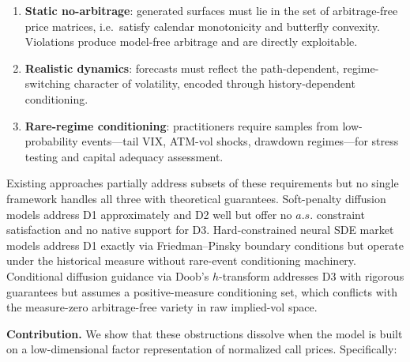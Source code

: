 \documentclass{article}
\newcommand{\1}{\mathbf{1}}
\begin{document}
\begin{enumerate}
\item[(D1)] \textbf{Static no-arbitrage}: generated surfaces must lie in the set of arbitrage-free price matrices, i.e.\ satisfy calendar monotonicity and butterfly convexity. Violations produce model-free arbitrage and are directly exploitable.
\item[(D2)] \textbf{Realistic dynamics}: forecasts must reflect the path-dependent, regime-switching character of volatility, encoded through history-dependent conditioning.
\item[(D3)] \textbf{Rare-regime conditioning}: practitioners require samples from low-probability events---tail VIX, ATM-vol shocks, drawdown regimes---for stress testing and capital adequacy assessment.
\end{enumerate}

Existing approaches partially address subsets of these requirements but no single framework handles all three with theoretical guarantees. Soft-penalty diffusion models \citep{jin2026} address D1 approximately and D2 well but offer no $a.s.$ constraint satisfaction and no native support for D3. Hard-constrained neural SDE market models \citep{cohen2021} address D1 exactly via Friedman--Pinsky boundary conditions but operate under the historical measure without rare-event conditioning machinery. Conditional diffusion guidance via Doob's $h$-transform \citep{guo2026} addresses D3 with rigorous guarantees but assumes a positive-measure conditioning set, which conflicts with the measure-zero arbitrage-free variety in raw implied-vol space.

\textbf{Contribution.} We show that these obstructions dissolve when the model is built on a low-dimensional factor representation of normalized call prices. Specifically:
\end{document}
